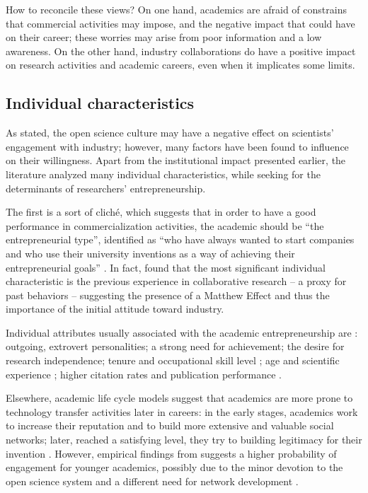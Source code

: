 How to reconcile these views? On one hand, academics are afraid of constrains that commercial activities may impose, and the negative impact that could have on their career; these worries may arise from poor information and a low awareness. On the other hand, industry collaborations do have a positive impact on research activities and academic careers, even when it implicates some limits.

\subsection{Individual characteristics}

As stated, the open science culture may have a negative effect on scientists' engagement with industry; however, many factors have been found to influence on their willingness. Apart from the institutional impact presented earlier, the literature analyzed many individual characteristics, while seeking for the determinants of researchers' entrepreneurship.

The first is a sort of cliché, which suggests that in order to have a good performance in commercialization activities, the academic should be \enquote{the entrepreneurial type}, identified as \enquote{who have always wanted to start companies and who use their university inventions as a way of achieving their entrepreneurial goals} \citep{Fini2009}. In fact, \citet{DEste2007} found that the most significant individual characteristic is the previous experience in collaborative research – a proxy for past behaviors – suggesting the presence of a Matthew Effect and thus the importance of the initial attitude toward industry.

Individual attributes usually associated with the academic entrepreneurship are \citep{OShea2004}: outgoing, extrovert personalities; a strong need for achievement; the desire for research independence; tenure and occupational skill level \citep{Roberts1991}; age and scientific experience \citep{Audretsch2000}; higher citation rates and publication performance \citep{Zucker2001}.

Elsewhere, academic life cycle models suggest that academics are more prone to technology transfer activities later in careers: in the early stages, academics work to increase their reputation and to build more extensive and valuable social networks; later, reached a satisfying level, they try to building legitimacy for their invention \citet{Fini2009}. However, empirical findings from \citet{DEste2007} suggests a higher probability of engagement for younger academics, possibly due to the minor devotion to the open science system and a different need for network development \citep{Bercovitz2006}.


